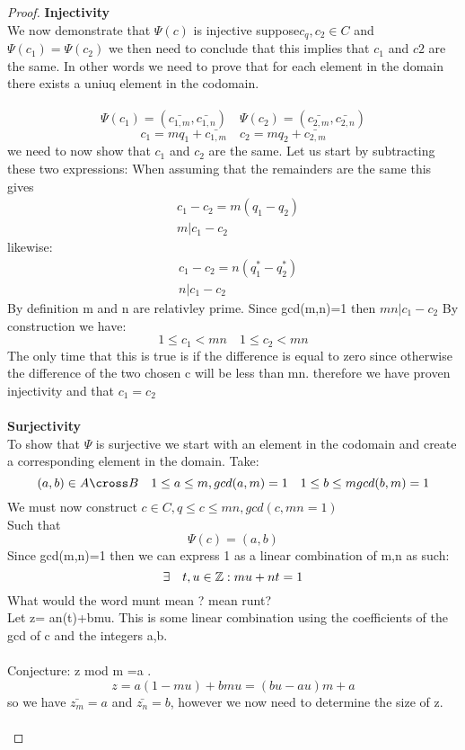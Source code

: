 \documentclass[11pt]{article}
\theoremstyle{definition}  %
\newcommand{\Z}{\mathbb{Z}}
\begin{document}
\begin{proof}
\textbf{Injectivity}\\
We now demonstrate that $\Psi(c)$ is injective suppose$c_q, c_2\in C$ and $\Psi(c_1)=\Psi(c_2)$ we then need to conclude that this implies that $c_1$ and $c2$ are the same. In other words we need to prove that for each element in the domain there exists a uniuq element in the codomain. \\\\
\[
  \Psi(c_1)=(\bar{c_{1,m}},\bar{c_{1,n}})\quad \Psi(c_2)=(\bar{c_{2,m}},\bar{c_{2,n}})
\]
\[
  c_1=mq_1+\bar{c_{1,m}}\quad c_2=mq_2+\bar{c_{2,m}}
\]
we need to now show that $c_1$ and $c_2$ are the same. Let us start by subtracting these two expressions: When assuming that the remainders are the same this gives
\begin{align*}
  &c_1-c_2=m(q_1-q_2)\\
  &m|c_1-c_2
\end{align*}
likewise:
\begin{align*}
  &c_1-c_2=n(q^*_1-q^*_2)\\
  &n|c_1-c_2
\end{align*}
By definition m and n are relativley prime. Since gcd(m,n)=1 then $mn|c_1-c_2$ By construction we have: \[
  1 \leq c_1<mn\quad 1 \leq c_2 <mn
\]
The only time that this is true is if the difference is equal to zero since otherwise the difference of the two chosen c will be less than mn. therefore we have proven injectivity and that $c_1=c_2$\\\\
\textbf{Surjectivity }\\
To show that $\Psi$ is surjective we start with an element in the codomain and create a corresponding element in the domain. Take:
\[
  (a,b)\in A\cross B\quad 1\leq a \leq m, gcd(a,m)=1\quad 1\leq b\leq m gcd(b,m)=1
\]
We must now construct $c\in C, q\leq c \leq mn , gcd(c,mn=1)$ \\
Such that \[
  \Psi(c)=(a,b)
\]
Since gcd(m,n)=1 then we can express 1 as a linear combination of m,n as such:
\[
  \exists \quad t,u\in \Z: mu+nt=1\\
\]
What would the word munt mean ? mean runt?\\
Let z= an(t)+bmu. This is some linear combination using the coefficients of the gcd of c and the integers a,b. \\\\
Conjecture: z mod m =a . \\
\[
  z=a(1-mu)+bmu=(bu-au)m+a
\]
so we have $\bar{z_m}=a$ and $\bar{z_n}=b$, however we now need to determine the size of z. \\\\

\end{proof}
\end{document}
